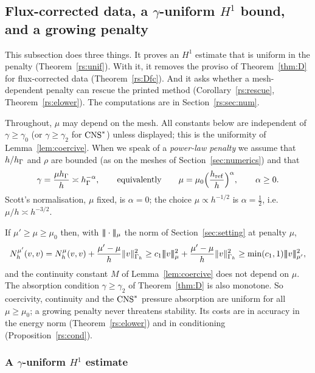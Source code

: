 \subsection{Flux-corrected data, a \texorpdfstring{$\gamma$}{gamma}-uniform \texorpdfstring{$H^1$}{H1} bound, and a growing penalty}\label{rs:sec}

This subsection does three things. It proves an $H^1$ estimate that is uniform in the penalty (Theorem~\ref{rs:unif}). With it, it removes the proviso of Theorem~\ref{thm:D} for flux-corrected data (Theorem~\ref{rs:Dfc}). And it asks whether a mesh-dependent penalty can rescue the printed method (Corollary~\ref{rs:rescue}, Theorem~\ref{rs:elower}). The computations are in Section~\ref{rs:sec:num}.

Throughout, $\mu$ may depend on the mesh. All constants below are independent of $\gamma\ge\gamma_0$ (or $\gamma\ge\gamma_2$ for $\mathrm{CNS}^\ast$) unless displayed; this is the uniformity of Lemma~\ref{lem:coercive}. When we speak of a \emph{power-law penalty} we assume that $h/h_\Gamma$ and $\rho$ are bounded (as on the meshes of Section~\ref{sec:numerics}) and that
\[
\gamma=\frac{\mu h_\Gamma}{h}\asymp h_\Gamma^{-\alpha},\qquad\text{equivalently}\qquad \mu=\mu_0\Bigl(\frac{h_{\mathrm{ref}}}{h}\Bigr)^{\alpha},\qquad \alpha\ge0 .
\]
Scott's normalisation, $\mu$ fixed, is $\alpha=0$; the choice $\mu\propto h^{-1/2}$ is $\alpha=\frac12$, i.e.\ $\mu/h\asymp h^{-3/2}$.

\begin{remark}\label{rs:coercive}
If $\mu'\ge\mu\ge\mu_0$ then, with $|\!|\!|\cdot|\!|\!|_\mu$ the norm of Section~\ref{sec:setting} at penalty $\mu$,
\[
N_h^{\mu'}(v,v)=N_h^{\mu}(v,v)+\frac{\mu'-\mu}{h}\norm{v}^2_{\Gh}\ge c_1\tnorm v_\mu^2+\frac{\mu'-\mu}{h}\norm v^2_{\Gh}\ge\min(c_1,1)\tnorm v_{\mu'}^2 ,
\]
and the continuity constant $M$ of Lemma~\ref{lem:coercive} does not depend on $\mu$. The absorption condition $\gamma\ge\gamma_2$ of Theorem~\ref{thm:D} is also monotone. So coercivity, continuity and the $\mathrm{CNS}^\ast$ pressure absorption are uniform for all $\mu\ge\mu_0$; a growing penalty never threatens stability. Its costs are in accuracy in the energy norm (Theorem~\ref{rs:elower}) and in conditioning (Proposition~\ref{rs:cond}).
\end{remark}

\subsubsection{A \texorpdfstring{$\gamma$}{gamma}-uniform \texorpdfstring{$H^1$}{H1} estimate}

